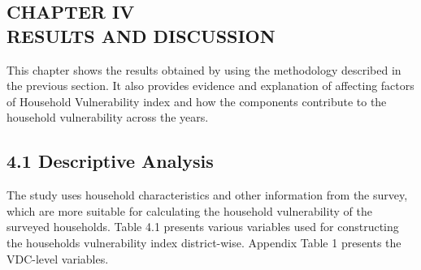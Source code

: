 \documentclass[12pt, a4paper]{article}
\begin{document}
\clearpage
\begin{center}
\section*{\large{CHAPTER IV \\ \vspace{-0.3cm} RESULTS AND DISCUSSION}}
\end{center}
\renewcommand{\thepage}{\arabic{page}}
This chapter shows the results obtained by using the methodology described in the
previous section. It also provides evidence and explanation of affecting factors of
Household Vulnerability index and how the components contribute to the household vulnerability across the years. \\


\subsection*{4.1 Descriptive Analysis}
\renewcommand{\thepage}{\arabic{page}}
The study uses household characteristics and other information from
the survey, which are more suitable for calculating the household vulnerability of the surveyed households. Table 4.1 presents various variables used for constructing the households vulnerability index district-wise. Appendix Table 1 presents the VDC-level variables.   
\end{document}
